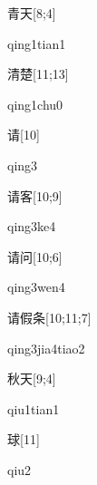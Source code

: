 \begin{verbete}{青天}[8;4]
\begin{pronuncia}{qing1tian1}
\end{pronuncia}
\end{verbete}

\begin{verbete}{清楚}[11;13]
\begin{pronuncia}{qing1chu0}
\end{pronuncia}
\end{verbete}

\begin{verbete}[qing3]{请}[10]
\begin{pronuncia}{qing3}
\end{pronuncia}
\end{verbete}

\begin{verbete}[qing3ke4]{请客}[10;9]
\begin{pronuncia}{qing3ke4}
\end{pronuncia}
\end{verbete}

\begin{verbete}{请问}[10;6]
\begin{pronuncia}{qing3wen4}
\end{pronuncia}
\end{verbete}

\begin{verbete}{请假条}[10;11;7]
\begin{pronuncia}{qing3jia4tiao2}
\end{pronuncia}
\end{verbete}

\begin{verbete}{秋天}[9;4]
\begin{pronuncia}{qiu1tian1}
\end{pronuncia}
\end{verbete}

\begin{verbete}[qiu2]{球}[11]
\begin{pronuncia}{qiu2}
\end{pronuncia}
\end{verbete}

